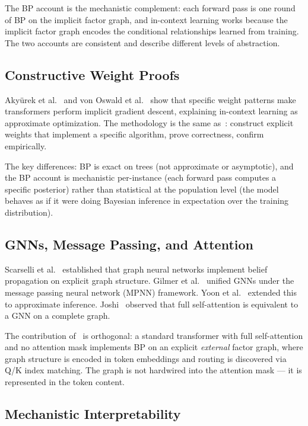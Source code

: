 The BP account is the mechanistic complement: each forward pass is one round of BP
on the implicit factor graph, and in-context learning works because the implicit
factor graph encodes the conditional relationships learned from training. The two
accounts are consistent and describe different levels of abstraction.

\subsection*{Constructive Weight Proofs}

Aky\"{u}rek et al.~\cite{akyurek2023icl} and von Oswald et
al.~\cite{oswald2023gradient} show that specific weight patterns make transformers
perform implicit gradient descent, explaining in-context learning as approximate
optimization. The methodology is the same as~\cite{coppola2026transformers}:
construct explicit weights that implement a specific algorithm, prove correctness,
confirm empirically.

The key differences: BP is exact on trees (not approximate or asymptotic), and the
BP account is mechanistic per-instance (each forward pass computes a specific
posterior) rather than statistical at the population level (the model behaves as if
it were doing Bayesian inference in expectation over the training distribution).

\subsection*{GNNs, Message Passing, and Attention}

Scarselli et al.~\cite{scarselli2009gnn} established that graph neural networks
implement belief propagation on explicit graph structure. Gilmer et
al.~\cite{gilmer2017mpnn} unified GNNs under the message passing neural network
(MPNN) framework. Yoon et al.~\cite{yoon2019gnn} extended this to approximate
inference. Joshi~\cite{joshi2020gnn} observed that full self-attention is equivalent
to a GNN on a complete graph.

The contribution of~\cite{coppola2026transformers} is orthogonal: a standard
transformer with full self-attention and no attention mask implements BP on an
explicit \emph{external} factor graph, where graph structure is encoded in token
embeddings and routing is discovered via Q/K index matching. The graph is not
hardwired into the attention mask --- it is represented in the token content.

\subsection*{Mechanistic Interpretability}


